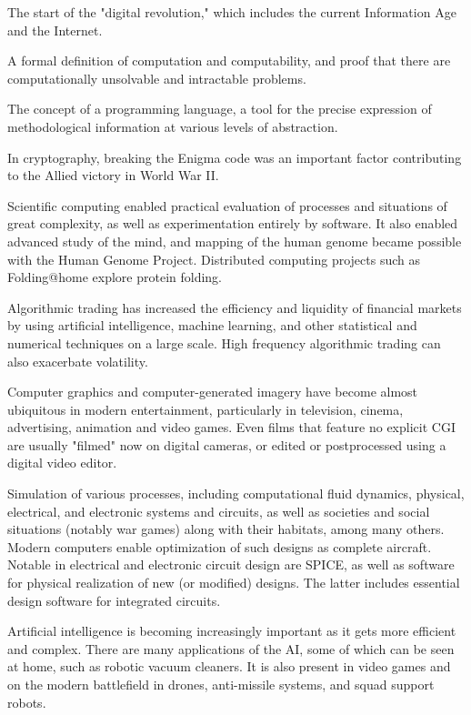 \begin{compactitem}
\item The start of the "digital revolution," which includes the current Information Age and the Internet.

\item A formal definition of computation and computability, and proof that there are computationally unsolvable and intractable problems.

\item The concept of a programming language, a tool for the precise expression of methodological information at various levels of abstraction.

\item In cryptography, breaking the Enigma code was an important factor contributing to the Allied victory in World War II.

\item Scientific computing enabled practical evaluation of processes and situations of great complexity, as well as experimentation entirely by software. It also enabled advanced study of the mind, and mapping of the human genome became possible with the Human Genome Project. Distributed computing projects such as Folding@home explore protein folding.

\item Algorithmic trading has increased the efficiency and liquidity of financial markets by using artificial intelligence, machine learning, and other statistical and numerical techniques on a large scale. High frequency algorithmic trading can also exacerbate volatility.

\item Computer graphics and computer-generated imagery have become almost ubiquitous in modern entertainment, particularly in television, cinema, advertising, animation and video games. Even films that feature no explicit CGI are usually "filmed" now on digital cameras, or edited or postprocessed using a digital video editor.

\item Simulation of various processes, including computational fluid dynamics, physical, electrical, and electronic systems and circuits, as well as societies and social situations (notably war games) along with their habitats, among many others. Modern computers enable optimization of such designs as complete aircraft. Notable in electrical and electronic circuit design are SPICE, as well as software for physical realization of new (or modified) designs. The latter includes essential design software for integrated circuits.

\item Artificial intelligence is becoming increasingly important as it gets more efficient and complex. There are many applications of the AI, some of which can be seen at home, such as robotic vacuum cleaners. It is also present in video games and on the modern battlefield in drones, anti-missile systems, and squad support robots.
\end{compactitem}



